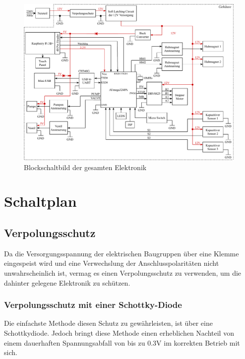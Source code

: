 \begin{figure}[hb]
    \centering
    \includegraphics[scale=0.85,page=1]{fig/elektro/Blockschaltbild.pdf}
    \caption{Blockschaltbild der gesamten Elektronik}\label{fig:Blockschaltbild}
\end{figure}

\newpage


\section{Schaltplan}

\subsection{Verpolungsschutz}
Da die Versorgungsspannung der elektrischen Baugruppen über eine Klemme eingespeist wird und eine Verwechslung der Anschlusspolaritäten nicht unwahrscheinlich ist,
vermag es einen Verpolungsschutz zu verwenden, um die dahinter gelegene Elektronik zu schützen.

\subsubsection{Verpolungsschutz mit einer Schottky-Diode}
Die einfachste Methode diesen Schutz zu gewährleisten, ist über eine Schottkydiode.
Jedoch bringt diese Methode einen erheblichen Nachteil von einem dauerhaften Spannungsabfall von bis zu 0.3V im korrekten Betrieb mit sich.

